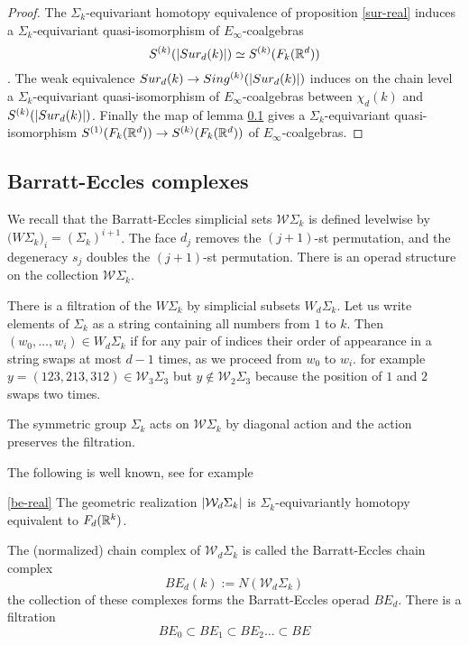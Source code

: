 \begin{proof}
	The $\Sigma_k$-equivariant homotopy equivalence of proposition \ref{sur-real} induces a $\Sigma_k$-equivariant  quasi-isomorphism of $E_{\infty}$-coalgebras
	$$S^{(k)}(\lvert Sur_d(k)\rvert) \simeq S^{(k)}(F_k(\mathbb{R}^d))$$.
	The weak equivalence %
	$Sur_d(k) \to Sing^{(k)}(\lvert Sur_d(k)\rvert)$ induces on the chain level a $\Sigma_k$-equivariant  quasi-isomorphism of
	$E_\infty$-coalgebras
	between $\chi_d(k)$
	and $S^{(k)}(\lvert Sur_d(k)\rvert)$.
	Finally the map of lemma \ref{} gives a $\Sigma_k$-equivariant quasi-isomorphism $S^{(1)}(F_k(\mathbb{R}^d)) \to S^{(k)}(F_k(\mathbb{R}^d))$ of $E_\infty$-coalgebras.
\end{proof}

\subsection{Barratt-Eccles complexes}

We recall that the Barratt-Eccles simplicial sets $\mathcal{W}\Sigma_k$ is defined levelwise by $\mathcal({W}\Sigma_k)_i=(\Sigma_k)^{i+1}$.
The face $d_{j}$ removes the $(j+1)$-st permutation, and the degeneracy $s_j$ doubles the $(j+1)$-st permutation.
There is an operad structure on the collection $\mathcal{W} \Sigma_k$.

There is a filtration of the $W \Sigma_k$ by simplicial subsets
$W_d \Sigma_k$.
Let us write elements of $\Sigma_k$ as a string containing all numbers from $1$ to $k$.
Then $(w_0,\dots,w_i) \in W_d \Sigma_k$ if for any pair of indices their order of appearance in a string swaps at most $d-1$ times, as we proceed from $w_0$ to $w_i$.
for example $y=(123,213,312) \in \mathcal{W}_3 \Sigma_3$ but $y \notin \mathcal{W}_2 \Sigma_3$
because the position of $1$ and $2$ swaps two times.

The symmetric group $\Sigma_k$ acts on
$\mathcal{W} \Sigma_k$ by diagonal action and the action preserves the filtration.

The following is well known, see for example \cite{BF}
\begin{proposition} \ref{be-real}
	The geometric realization $\lvert\mathcal{W}_d \Sigma_k\rvert$ is $\Sigma_k$-equivariantly homotopy equivalent to $F_d(\mathbb{R}^k)$.
\end{proposition}

The (normalized) chain complex of $\mathcal{W}_d\Sigma_k$ is called the Barratt-Eccles chain complex $$BE_d(k):=N(\mathcal{W}_d\Sigma_k)$$
the collection of these complexes forms the Barratt-Eccles operad $BE_d$.
\cite{BF}
There is a filtration
$$BE_0 \subset BE_1 \subset BE_2 \dots \subset BE$$

